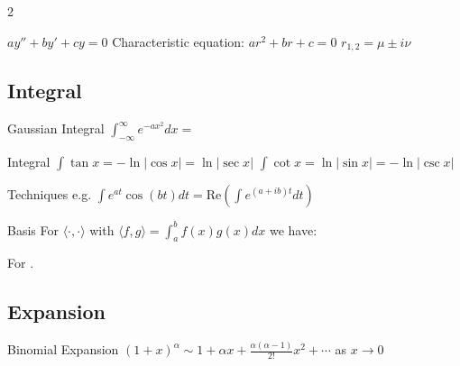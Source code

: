 \documentclass{note}
\begin{document}
\begin{multicols}{2}
{{    \begin{MyTh}{$ay''+by'+cy=0$} 
        Characteristic equation: $ar^2+br+c=0$ \quad $r_{1,2}= \mu \pm i\nu$

        \quad {}
    \end{MyTh}

    \subsection{Integral}

    \vspace{-2pt}
    \begin{MyTh}{Gaussian Integral}
        $\int^\infty_{-\infty} e^{-ax^2} dx =$  \qquad {}
    \end{MyTh}

    \begin{MyTh}{Integral}
        $\int \tan x = -\ln|\cos x| = \ln|\sec x|$ \quad $\int \cot x = \ln|\sin x|= -\ln|\csc x|$
    \end{MyTh}

    \begin{MyTh}{Techniques}
         e.g. $\int e^{at}\cos(bt)dt=\mathrm{Re}(\int e^{(a+ib)t}dt)$
    \end{MyTh}
    
    \begin{MyTh}{Basis}
        For $\langle \cdot,\cdot \rangle$ with $\langle f,g\rangle = \int_a^b f(x)g(x) dx$  we have: \quad {}

        For .
    \end{MyTh}


    \subsection{Expansion}

    \vspace{-2pt}
    \begin{MyTh}{Binomial Expansion}
        $(1+x)^{\alpha}\sim 1+\alpha x + \frac{\alpha(\alpha-1)}{2!}x^2 + \cdots$ as $x\to0$
    \end{MyTh}

}}
\end{multicols}
\end{document}
